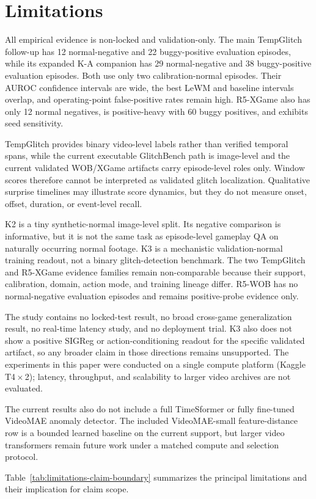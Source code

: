 \section{Limitations}
\label{sec:limitations}

All empirical evidence is non-locked and validation-only. The main TempGlitch follow-up has 12
normal-negative and 22 buggy-positive evaluation episodes, while its expanded K-A companion has 29
normal-negative and 38 buggy-positive evaluation episodes. Both use only two calibration-normal
episodes. Their AUROC confidence intervals are wide, the best LeWM and baseline intervals overlap,
and operating-point false-positive rates remain high. R5-XGame also has only 12 normal negatives,
is positive-heavy with 60 buggy positives, and exhibits seed sensitivity.

TempGlitch provides binary video-level labels rather than verified temporal spans, while the
current executable GlitchBench path is image-level and the current validated WOB/XGame artifacts
carry episode-level roles only. Window scores therefore cannot be interpreted as validated glitch
localization. Qualitative surprise timelines may illustrate score dynamics, but they do not
measure onset, offset, duration, or event-level recall.

K2 is a tiny synthetic-normal image-level split. Its negative comparison is informative, but it is
not the same task as episode-level gameplay QA on naturally occurring normal footage. K3 is a
mechanistic validation-normal training readout, not a binary glitch-detection benchmark. The two
TempGlitch and R5-XGame evidence families remain non-comparable because their support, calibration,
domain, action mode, and training lineage differ. R5-WOB has no normal-negative evaluation
episodes and remains positive-probe evidence only.

The study contains no locked-test result, no broad cross-game generalization result, no real-time
latency study, and no deployment trial. K3 also does not show a positive SIGReg or
action-conditioning readout for the specific validated artifact, so any broader claim in those
directions remains unsupported. The experiments in this paper were conducted on a single compute
platform (Kaggle T4\,$\times$\,2); latency, throughput, and scalability to larger video archives
are not evaluated.

The current results also do not include a full TimeSformer or fully fine-tuned VideoMAE anomaly
detector. The included VideoMAE-small feature-distance row is a bounded learned baseline on the
current support, but larger video transformers remain future work under a matched compute and
selection protocol.

Table~\ref{tab:limitations-claim-boundary} summarizes the principal limitations and their
implication for claim scope.


